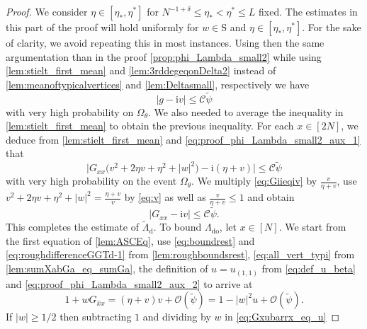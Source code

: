 \documentclass[10pt,a4paper]{amsart}
\newcommand{\ii}{\mathrm{i}}
\newcommand{\abs}[1]{\left| #1 \right|}
\numberwithin{equation}{section}
\newcommand*\ubarr[1]{{\widehat{#1}}}
\newcommand{\nc}{\normalcolor}
\begin{document}
	\begin{proof}
		We consider $\eta \in [\eta_{\ast},\eta^{\ast}]$ for $N^{-1+\delta} \le \eta_{\ast} < \eta^{\ast} \le L$ fixed. The estimates in this part of the proof will hold uniformly for $w \in \mathrm{S}$ and $\eta \in [\eta_*,\eta^*]$. For the sake of clarity, we avoid repeating this in most instances. Using then the same argumentation than in the proof \cref{prop:phi_Lambda_small2}  while using \cref{lem:stielt_first_mean} and \cref{lem:3rddegeqonDelta2} instead of \cref{lem:meanoftypicalvertices} and \cref{lem:Deltasmall}, respectively we have
		\begin{equation} \label{eq:proof_phi_Lambda_small2_aux_1} 
			\abs{g - \ii v } \leq \mathcal C \widetilde{\psi}
		\end{equation} 
		with very high probability on $\Omega_\theta$. We also needed to average the inequality in \cref{lem:stielt_first_mean} to obtain the previous inequality.
		For each $x \in [2N]$, we deduce from \cref{lem:stielt_first_mean} and \eqref{eq:proof_phi_Lambda_small2_aux_1} that \nc 
		\begin{equation}\label{eq:Giieqiv}
			\bigl|G_{xx} \bigl( v^2  +2 \eta v + \eta^2 + \abs{w}^2 \bigr) -  \ii (\eta + v) \bigr| \le  \mathcal{C} \widetilde{\psi}
		\end{equation}
		with very high probability on the event $\Omega_{\theta}$. We multiply \eqref{eq:Giieqiv} by $\frac{v}{\eta + v}$, use $v^2  +2 \eta v + \eta^2 + \abs{w}^2= \frac{\eta + v}{v}$ by \eqref{eq:v} as well as $\frac{v}{\eta + v} \leq 1$ and obtain 
		\begin{equation}\label{eq:proof_phi_Lambda_small2_aux_2} 
			|G_{xx} - \ii v | \le \mathcal C \widetilde{\psi}.
		\end{equation}
		This completes the estimate of $\tilde{\Lambda}_{\mathrm{d}}$.	To bound $ \Lambda_{\mathrm{do}}$, 
		let $x \in [N]$. We start from the first equation of \cref{lem:ASCEq}, use \eqref{eq:boundrest} and \eqref{eq:roughdifferenceGGTd-1} from \cref{lem:roughboundsrest}, \eqref{eq:all_vert_typi} from \cref{lem:sumXabGa_eq_sumGa}, the definition of $u=u_{(1,1)}$ from \eqref{eq:def_u_beta} and \eqref{eq:proof_phi_Lambda_small2_aux_2} to arrive at 
		\begin{equation}
			1 + w G_{\ubarr{x}x} = ( \eta +  v) v + \mathcal O ( \widetilde{\psi}) 
			=1 - \abs{w}^2 u + \mathcal O ( \widetilde{\psi}).\label{eq:Gxubarrx_eq_u}
		\end{equation}
		If $\abs{w} \geq 1/2$ then subtracting $1$ and dividing by $w$ in \eqref{eq:Gxubarrx_eq_u} 

\end{proof}
\end{document}
